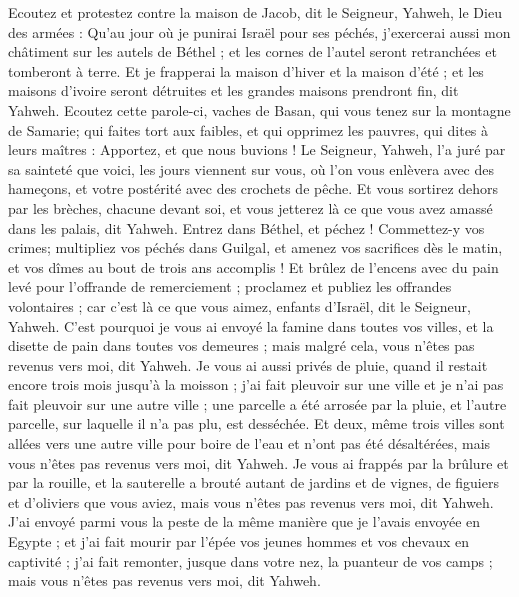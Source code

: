 \begin{multicols}{2}
Ecoutez et protestez contre la maison de Jacob, dit le Seigneur, Yahweh, le Dieu des armées :
Qu'au jour où je punirai Israël pour ses péchés, j'exercerai aussi mon châtiment sur les autels de Béthel ; et les cornes de l'autel seront retranchées et tomberont à terre.
Et je frapperai la maison d'hiver et la maison d'été ; et les maisons d'ivoire seront détruites et les grandes maisons prendront fin, dit Yahweh.
\VerseOne{}Ecoutez cette parole-ci, vaches de Basan, qui vous tenez sur la montagne de Samarie; qui faites tort aux faibles, et qui opprimez les pauvres, qui dites à leurs maîtres : Apportez, et que nous buvions !
Le Seigneur, Yahweh, l'a juré par sa sainteté que voici, les jours viennent sur vous, où l'on vous enlèvera avec des hameçons, et votre postérité avec des crochets de pêche.
Et vous sortirez dehors par les brèches, chacune devant soi, et vous jetterez là ce que vous avez amassé dans les palais, dit Yahweh.
Entrez dans Béthel, et péchez ! Commettez-y vos crimes; multipliez vos péchés dans Guilgal, et amenez vos sacrifices dès le matin, et vos dîmes au bout de trois ans accomplis !
Et brûlez de l'encens avec du pain levé pour l'offrande de remerciement ; proclamez et publiez les offrandes volontaires ; car c'est là ce que vous aimez, enfants d'Israël, dit le Seigneur, Yahweh.
C'est pourquoi je vous ai envoyé la famine dans toutes vos villes, et la disette de pain dans toutes vos demeures ; mais malgré cela, vous n'êtes pas revenus vers moi, dit Yahweh.
Je vous ai aussi privés de pluie, quand il restait encore trois mois jusqu'à la moisson ; j'ai fait pleuvoir sur une ville et je n'ai pas fait pleuvoir sur une autre ville ; une parcelle a été arrosée par la pluie, et l'autre parcelle, sur laquelle il n'a pas plu, est desséchée.
Et deux, même trois villes sont allées vers une autre ville pour boire de l'eau et n'ont pas été désaltérées, mais vous n'êtes pas revenus vers moi, dit Yahweh.
Je vous ai frappés par la brûlure et par la rouille, et la sauterelle a brouté autant de jardins et de vignes, de figuiers et d'oliviers que vous aviez, mais vous n'êtes pas revenus vers moi, dit Yahweh.
J'ai envoyé parmi vous la peste de la même manière que je l'avais envoyée en Egypte ; et j'ai fait mourir par l'épée vos jeunes hommes et vos chevaux en captivité ; j'ai fait remonter, jusque dans votre nez, la puanteur de vos camps ; mais vous n'êtes pas revenus vers moi, dit Yahweh.

\end{multicols}
